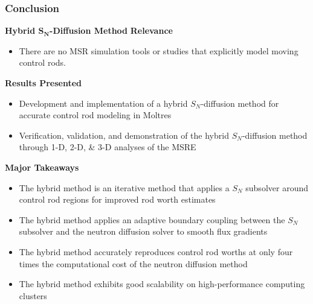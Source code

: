 \begin{frame}
  \frametitle{Conclusion}
  \begin{block}{\textbf{Hybrid $\bm{S_N}$-Diffusion Method}}
    \textbf{Relevance}
    \begin{itemize}
      \item There are no MSR simulation tools or studies that explicitly model moving control rods.
    \end{itemize}
    \textbf{Results Presented}
    \begin{itemize}
      \item Development and implementation of a hybrid $S_N$-diffusion method for
        accurate control rod modeling in Moltres
      \item Verification, validation, and demonstration of the hybrid $S_N$-diffusion
        method through 1-D, 2-D, \& 3-D analyses of the MSRE
    \end{itemize}
    \textbf{Major Takeaways}
    \begin{itemize}
      \item The hybrid method is an iterative method that applies a $S_N$ subsolver around control
        rod regions for improved rod worth estimates
      \item The hybrid method applies an adaptive boundary coupling between
        the $S_N$ subsolver and the neutron diffusion solver to smooth flux gradients
      \item The hybrid method accurately reproduces control rod worths at only four times the
        computational cost of the neutron diffusion method
      \item The hybrid method exhibits good scalability on high-performance computing clusters
    \end{itemize}
  \end{block}
\end{frame}
